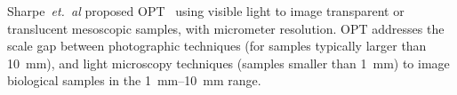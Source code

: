 \documentclass{osa-article}
\begin{document}


Sharpe~\emph{et.~al} proposed OPT~\cite{sharpeOpticalProjectionTomography2002}
using visible light to image transparent or translucent mesoscopic samples, with micrometer resolution.
OPT addresses the scale gap between photographic techniques (for samples typically larger than \SI{10}{\milli\meter}), and light microscopy techniques (samples smaller than \SI{1}{\milli\meter}) to image biological samples in the \SIrange{1}{10}{\milli\meter} range.
\end{document}
